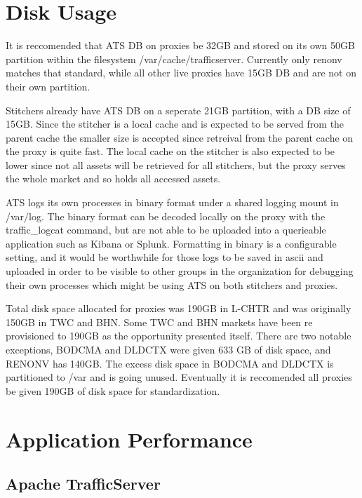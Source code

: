 \documentclass{article}
\begin{document}
\section{Disk Usage}
\label{SECTION-Disk}

It is reccomended that ATS DB on proxies be 32GB and stored on its own 50GB partition within the filesystem /var/cache/trafficserver. Currently only renonv matches that standard, while all other live proxies have 15GB DB and are not on their own partition. 

Stitchers already have ATS DB on a seperate 21GB partition, with a DB size of 15GB. Since the stitcher is a local cache and is expected to be served from the parent cache the smaller size is accepted since retreival from the parent cache on the proxy is quite fast. The local cache on the stitcher is also expected to be lower since not all assets will be retrieved for all stitchers, but the proxy serves the whole market and so holds all accessed assets. 

ATS logs its own processes in binary format under a shared logging mount in /var/log. The binary format can be decoded locally on the proxy with the traffic\_logcat command, but are not able to be uploaded into a querieable application such as Kibana or Splunk. Formatting in binary is a configurable setting, and it would be worthwhile for those logs to be saved in ascii and uploaded in order to be visible to other groups in the organization for debugging their own processes which might be using ATS on both stitchers and proxies. 

Total disk space allocated for proxies was 190GB in L-CHTR and was originally 150GB in TWC and BHN. Some TWC and BHN markets have been re provisioned to 190GB as the opportunity presented itself. There are two notable exceptions, BODCMA and DLDCTX were given 633 GB of disk space, and RENONV has 140GB. The excess disk space in BODCMA and DLDCTX is partitioned to /var and is going unused. Eventually it is reccomended all proxies be given 190GB of disk space for standardization. 

\section{Application Performance}
\label{SECTION-APPPerf}

\subsection{Apache TrafficServer}
\label{SECTION-ATS}
\end{document}
